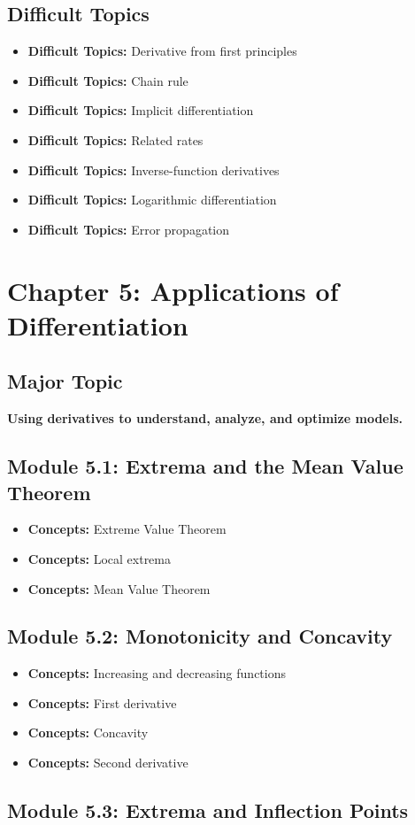 \documentclass[11pt]{article}
\newcommand{\concept}[1]{\item \textbf{Concepts:} #1}
\newcommand{\difficult}[1]{\item \textbf{Difficult Topics:} #1}
\begin{document}
\subsection{Difficult Topics}

\begin{itemize}
    \difficult{Derivative from first principles}
    \difficult{Chain rule}
    \difficult{Implicit differentiation}
    \difficult{Related rates}
    \difficult{Inverse-function derivatives}
    \difficult{Logarithmic differentiation}
    \difficult{Error propagation}
\end{itemize}


\section{Chapter 5: Applications of Differentiation}

\subsection{Major Topic}

\textbf{Using derivatives to understand, analyze, and optimize models.}

\subsection{Module 5.1: Extrema and the Mean Value Theorem}

\begin{itemize}
    \concept{Extreme Value Theorem}
    \concept{Local extrema}
    \concept{Mean Value Theorem}
\end{itemize}

\subsection{Module 5.2: Monotonicity and Concavity}

\begin{itemize}
    \concept{Increasing and decreasing functions}
    \concept{First derivative}
    \concept{Concavity}
    \concept{Second derivative}
\end{itemize}

\subsection{Module 5.3: Extrema and Inflection Points}
\end{document}
